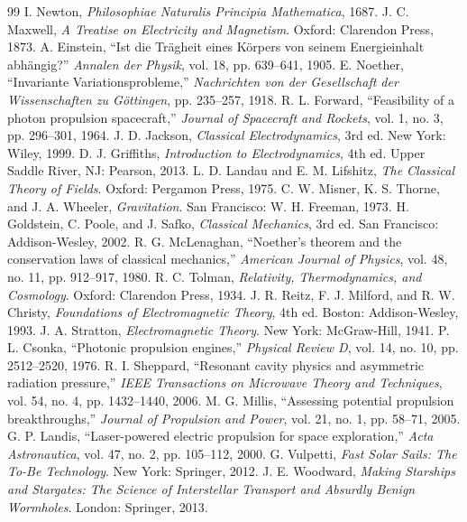 \documentclass[journal,10pt,twoside]{IEEEtran}
\begin{document}
\begin{thebibliography}{99}
 I. Newton, \textit{Philosophiae Naturalis Principia Mathematica}, 1687.
 J. C. Maxwell, \textit{A Treatise on Electricity and Magnetism}. Oxford: Clarendon Press, 1873.
 A. Einstein, ``Ist die Trägheit eines Körpers von seinem Energieinhalt abhängig?'' \textit{Annalen der Physik}, vol. 18, pp. 639--641, 1905.
 E. Noether, ``Invariante Variationsprobleme,'' \textit{Nachrichten von der Gesellschaft der Wissenschaften zu Göttingen}, pp. 235--257, 1918.
 R. L. Forward, ``Feasibility of a photon propulsion spacecraft,'' \textit{Journal of Spacecraft and Rockets}, vol. 1, no. 3, pp. 296--301, 1964.
 J. D. Jackson, \textit{Classical Electrodynamics}, 3rd ed. New York: Wiley, 1999.
 D. J. Griffiths, \textit{Introduction to Electrodynamics}, 4th ed. Upper Saddle River, NJ: Pearson, 2013.
 L. D. Landau and E. M. Lifshitz, \textit{The Classical Theory of Fields}. Oxford: Pergamon Press, 1975.
 C. W. Misner, K. S. Thorne, and J. A. Wheeler, \textit{Gravitation}. San Francisco: W. H. Freeman, 1973.
 H. Goldstein, C. Poole, and J. Safko, \textit{Classical Mechanics}, 3rd ed. San Francisco: Addison-Wesley, 2002.
 R. G. McLenaghan, ``Noether's theorem and the conservation laws of classical mechanics,'' \textit{American Journal of Physics}, vol. 48, no. 11, pp. 912--917, 1980.
 R. C. Tolman, \textit{Relativity, Thermodynamics, and Cosmology}. Oxford: Clarendon Press, 1934.
 J. R. Reitz, F. J. Milford, and R. W. Christy, \textit{Foundations of Electromagnetic Theory}, 4th ed. Boston: Addison-Wesley, 1993.
 J. A. Stratton, \textit{Electromagnetic Theory}. New York: McGraw-Hill, 1941.
 P. L. Csonka, ``Photonic propulsion engines,'' \textit{Physical Review D}, vol. 14, no. 10, pp. 2512--2520, 1976.
 R. I. Sheppard, ``Resonant cavity physics and asymmetric radiation pressure,'' \textit{IEEE Transactions on Microwave Theory and Techniques}, vol. 54, no. 4, pp. 1432--1440, 2006.
 M. G. Millis, ``Assessing potential propulsion breakthroughs,'' \textit{Journal of Propulsion and Power}, vol. 21, no. 1, pp. 58--71, 2005.
 G. P. Landis, ``Laser-powered electric propulsion for space exploration,'' \textit{Acta Astronautica}, vol. 47, no. 2, pp. 105--112, 2000.
 G. Vulpetti, \textit{Fast Solar Sails: The To-Be Technology}. New York: Springer, 2012.
 J. E. Woodward, \textit{Making Starships and Stargates: The Science of Interstellar Transport and Absurdly Benign Wormholes}. London: Springer, 2013.

\end{thebibliography}
\end{document}
